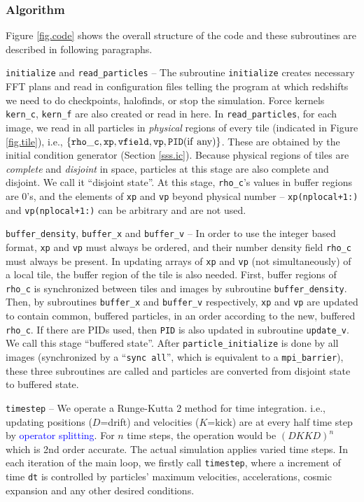 \documentclass[10pt,twocolumn,preprint]{emulateapj}
\newcommand{\tcb}{\textcolor{blue}}
\begin{document}
\subsubsection{Algorithm}\label{sss.algorithm}
Figure \ref{fig.code} shows the overall structure of the code and these subroutines are described in following paragraphs. 

{\tt initialize} and {\tt read\_particles} -- The subroutine {\tt initialize} creates necessary FFT plans and read in configuration files telling the program at which redshifts we need to do checkpoints, halofinds, or stop the simulation. Force kernels {\tt kern\_c}, {\tt kern\_f} are also created or read in here. In {\tt read\_particles}, for each image, we read in all particles in {\it physical} regions of every tile (indicated in Figure \ref{fig.tile}), i.e., $\{{\tt rho\_c},{\tt xp},{\tt vfield},{\tt vp},{\tt PID}({\rm if\ any})\}$. These are obtained by the initial condition generator (Section \ref{sss.ic}). Because physical regions of tiles are {\it complete} and {\it disjoint} in space, particles at this stage are also complete and disjoint. We call it ``disjoint state''. At this stage, {\tt rho\_c}'s values in buffer regions are 0's, and the elements of {\tt xp} and {\tt vp} beyond physical number -- {\tt xp(nplocal+1:)} and {\tt vp(nplocal+1:)} can be arbitrary and are not used.

{\tt buffer\_density}, {\tt buffer\_x} and {\tt buffer\_v} -- In order to use the integer based format, {\tt xp} and {\tt vp} must always be ordered, and their number density field {\tt rho\_c} must always be present. In updating arrays of {\tt xp} and {\tt vp} (not simultaneously) of a local tile, the buffer region of the tile is also needed. First, buffer regions of {\tt rho\_c} is synchronized between tiles and images by subroutine {\tt buffer\_density}. Then, by subroutines {\tt buffer\_x} and {\tt buffer\_v} respectively, {\tt xp} and {\tt vp} are updated to contain common, buffered particles, in an order according to the new, buffered {\tt rho\_c}. If there are PIDs used, then {\tt PID} is also updated in subroutine {\tt update\_v}. We call this stage ``buffered state''. After {\tt particle\_initialize} is done by all images (synchronized by a ``{\tt sync all}'', which is equivalent to a {\tt mpi\_barrier}), these three subroutines are called and particles are converted from disjoint state to buffered state.

{\tt timestep} --
We operate a Runge-Kutta 2 method for time integration. i.e., updating positions ($D$=drift) and velocities ($K$=kick) are at every half time step by \tcb{operator splitting}. For $n$ time steps, the operation would be $(DKKD)^n$ which is 2nd order accurate. The actual simulation applies varied time steps. In each iteration of the main loop, we firstly call {\tt timestep}, where a increment of time {\tt dt} is controlled by particles' maximum velocities, accelerations, cosmic expansion and any other desired conditions.
\end{document}
